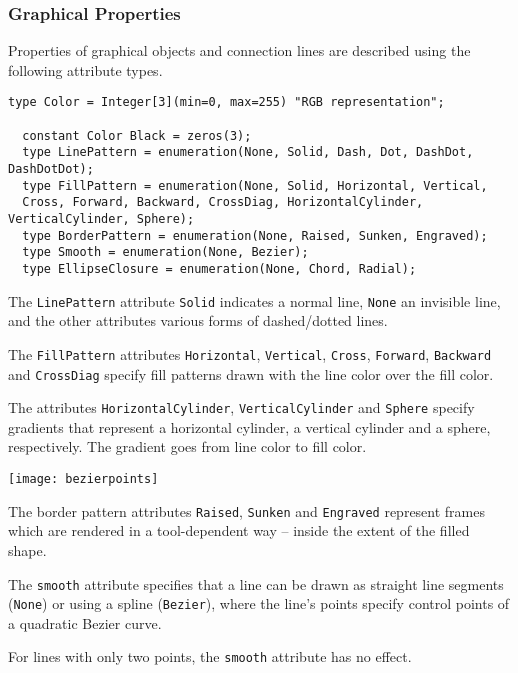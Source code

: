 \subsubsection{Graphical Properties}

Properties of graphical objects and connection lines are described using
the following attribute types.

\begin{lstlisting}[language=modelica]
  type Color = Integer[3](min=0, max=255) "RGB representation";

  constant Color Black = zeros(3);
  type LinePattern = enumeration(None, Solid, Dash, Dot, DashDot, DashDotDot);
  type FillPattern = enumeration(None, Solid, Horizontal, Vertical,
  Cross, Forward, Backward, CrossDiag, HorizontalCylinder, VerticalCylinder, Sphere);
  type BorderPattern = enumeration(None, Raised, Sunken, Engraved);
  type Smooth = enumeration(None, Bezier);
  type EllipseClosure = enumeration(None, Chord, Radial);
\end{lstlisting}
The \lstinline!LinePattern! attribute \lstinline!Solid! indicates a normal line, \lstinline!None! an
invisible line, and the other attributes various forms of dashed/dotted
lines.

The \lstinline!FillPattern! attributes \lstinline!Horizontal!, \lstinline!Vertical!,
\lstinline!Cross!, \lstinline!Forward!,
\lstinline!Backward! and \lstinline!CrossDiag! specify fill patterns drawn with the line color
over the fill color.

The attributes \lstinline!HorizontalCylinder!, \lstinline!VerticalCylinder! and \lstinline!Sphere! specify
gradients that represent a horizontal cylinder, a vertical cylinder and
a sphere, respectively. The gradient goes from line color to fill color.

\texttt{[image: bezierpoints]}

The border pattern attributes \lstinline!Raised!, \lstinline!Sunken! and \lstinline!Engraved! represent frames
which are rendered in a tool-dependent way -- inside the extent of the
filled shape.

The \lstinline!smooth! attribute specifies that a line can be drawn as straight line
segments (\lstinline!None!) or using a spline (\lstinline!Bezier!), where the line's points
specify control points of a quadratic Bezier curve.

For lines with only two points, the \lstinline!smooth! attribute has no effect.

